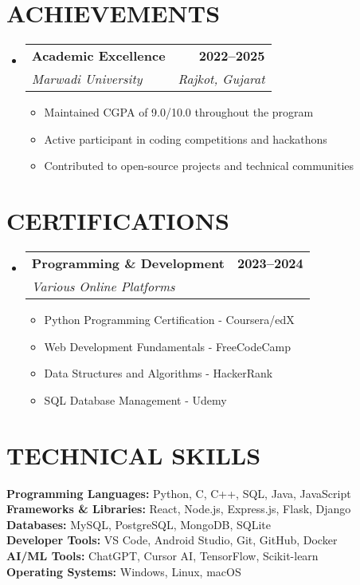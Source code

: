 \documentclass[letterpaper,11pt]{article}
\makeatletter
\newcommand{\resumeItem}[1]{
  \item\small{
    {#1 \vspace{-2pt}}
  }
}
\newcommand{\resumeSubheading}[4]{
  \vspace{-2pt}\item
    \begin{tabular*}{1.0\textwidth}[t]{l@{\extracolsep{\fill}}r}
      \textbf{\large#1} & \textbf{\small #2} \\
      \textit{\large#3} & \textit{\small #4} \\
     
    \end{tabular*}\vspace{-7pt}
}
\newcommand{\resumeSubHeadingListStart}{\begin{itemize}[leftmargin=0.0in, label={}]}
\newcommand{\resumeSubHeadingListEnd}{\end{itemize}}
\newcommand{\resumeItemListStart}{\begin{itemize}}
\newcommand{\resumeItemListEnd}{\end{itemize}\vspace{-5pt}}
\makeatother
\begin{document}
\section{ACHIEVEMENTS}
\resumeSubHeadingListStart
  \resumeSubheading
    {Academic Excellence}{2022--2025}
    {Marwadi University}{Rajkot, Gujarat}
    \resumeItemListStart
      \resumeItem{Maintained CGPA of 9.0/10.0 throughout the program}
      \resumeItem{Active participant in coding competitions and hackathons}
      \resumeItem{Contributed to open-source projects and technical communities}
    \resumeItemListEnd
\resumeSubHeadingListEnd

\section{CERTIFICATIONS}
\resumeSubHeadingListStart
  \resumeSubheading
    {Programming \& Development}{2023--2024}
    {Various Online Platforms}{}
    \resumeItemListStart
      \resumeItem{Python Programming Certification - Coursera/edX}
      \resumeItem{Web Development Fundamentals - FreeCodeCamp}
      \resumeItem{Data Structures and Algorithms - HackerRank}
      \resumeItem{SQL Database Management - Udemy}
    \resumeItemListEnd
\resumeSubHeadingListEnd

\section{TECHNICAL SKILLS}
 \begin{itemize}[leftmargin=0.15in, label={}]
    \small{\item{
     \textbf{\normalsize{Programming Languages:}}{ \normalsize{Python, C, C++, SQL, Java, JavaScript}} \\
     \textbf{\normalsize{Frameworks \& Libraries:}}{ \normalsize{React, Node.js, Express.js, Flask, Django}} \\
     \textbf{\normalsize{Databases:}}{ \normalsize{MySQL, PostgreSQL, MongoDB, SQLite}} \\
     \textbf{\normalsize{Developer Tools:}}{ \normalsize{VS Code, Android Studio, Git, GitHub, Docker}} \\
     \textbf{\normalsize{AI/ML Tools:}}{ \normalsize{ChatGPT, Cursor AI, TensorFlow, Scikit-learn}} \\
     \textbf{\normalsize{Operating Systems:}}{ \normalsize{Windows, Linux, macOS}} \\
    }}
 \end{itemize}
 \vspace{-15pt}
\end{document}
